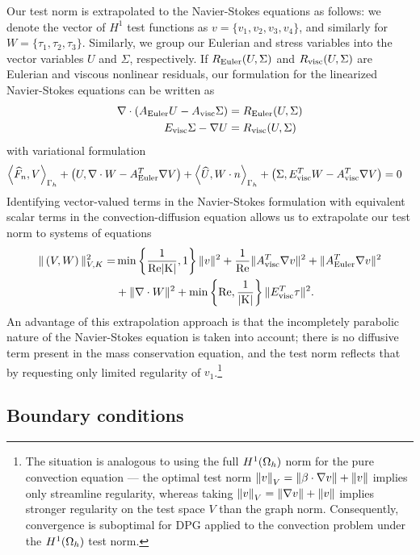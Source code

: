 Our test norm is extrapolated to the Navier-Stokes equations as follows: we denote the vector of $H^1$ test functions as $v=\{v_1,v_2,v_3,v_4\}$, and similarly for $W = \{\tau_1,\tau_2,\tau_3\}$. Similarly, we group our Eulerian and stress variables into the vector variables $U$ and $\Sigma$, respectively. If $R_{\rm Euler}(U,\Sigma)$ and $R_{\rm visc}(U,\Sigma)$ are Eulerian and viscous nonlinear residuals, our formulation for the linearized Navier-Stokes equations can be written as
\begin{align*}
\div \left(A_{\rm Euler}U - A_{\rm visc}\Sigma\right) &= R_{\rm Euler}(U,\Sigma)\\
E_{\rm visc} \Sigma - \grad U &= R_{\rm visc}(U,\Sigma)
\end{align*}
with variational formulation
\begin{align*}
\LRa{\widehat{F}_n,V}_{\Gh} + \left(U,\div W - A_{\rm Euler}^T\grad  V\right) + \LRa{\widehat{U},W\cdot n}_{\Gh} + \left(\Sigma,E_{\rm visc}^TW - A_{\rm visc}^T\grad  V\right) &= 0
\end{align*}
Identifying vector-valued terms in the Navier-Stokes formulation with equivalent scalar terms in the convection-diffusion equation allows us to extrapolate our test norm to systems of equations
\begin{align*}
\|\left(V,W\right)\|_{V,K}^2 =& \min\left\{\frac{1}{\Reyn|K|},1\right\}\|v\|^2 + \frac{1}{\Reyn} \|A_{\rm visc}^T\grad v\|^2 + \|A_{\rm Euler}^T \grad v\|^2 \\
& + \| \div W\|^2 + \min\left\{\Reyn,\frac{1}{|K|}\right\}\|E_{\rm visc}^T\tau\|^2.
\end{align*}
An advantage of this extrapolation approach is that the incompletely parabolic nature of the Navier-Stokes equation is taken into account; there is no diffusive term present in the mass conservation equation, and the test norm reflects that by requesting only limited regularity of $v_1$.\footnote{The situation is analogous to using the full $H^1(\Oh)$ norm for the pure convection equation --- the optimal test norm $\nor{v}_V = \nor{\beta\cdot \grad v} + \nor{v}$ implies only streamline regularity, whereas taking $\nor{v}_V = \nor{\grad v} + \nor{v}$ implies stronger regularity on the test space $V$ than the graph norm. Consequently, convergence is suboptimal for DPG applied to the convection problem under the $H^1(\Oh)$ test norm.}

\subsection{Boundary conditions}


